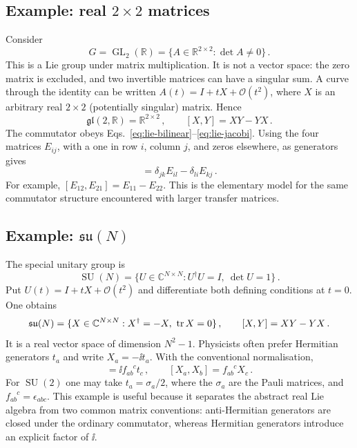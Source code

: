 \subsection{Example: real \texorpdfstring{$2\times2$}{2 x 2} matrices}

Consider
\begin{equation}
    G = \operatorname{GL}_2(\mathbb{R})
      = \{A\in\mathbb{R}^{2\times2}:\det A\ne0\}\,.
\end{equation}
This is a Lie group under matrix multiplication.  It is not a vector space:
the zero matrix is excluded, and two invertible matrices can have a singular
sum.  A curve through the identity can be written
$A(t) = I + tX + \mathcal{O}(t^2)$, where $X$ is an arbitrary real $2\times2$
(potentially singular) matrix.  Hence
\begin{equation}
    \mathfrak{gl}(2,\mathbb{R}) = \mathbb{R}^{2\times2}\,,
    \qquad [X,Y] = XY - YX\,.
\end{equation}
The commutator obeys Eqs.~\eqref{eq:lie-bilinear}--\eqref{eq:lie-jacobi}.
Using the four matrices $E_{ij}$, with a one in row $i$, column $j$, and
zeros elsewhere, as generators gives
\begin{equation}
    [E_{ij},E_{kl}] = \delta_{jk}E_{il}-\delta_{li}E_{kj}\,.
\end{equation}
For example,
$[E_{12},E_{21}] = E_{11}-E_{22}$.  This is the elementary model for the
same commutator structure encountered with larger transfer matrices.


\subsection{Example: \texorpdfstring{$\mathfrak{su}(N)$}{su(N)}}

The special unitary group is
\begin{equation}
    \operatorname{SU}(N) = \{U\in\mathbb{C}^{N\times N}:U^\dagger U
                         = I,\ \det U = 1\}\,.
\end{equation}
Put $U(t) = I + tX + \mathcal{O}(t^2)$ and differentiate both defining
conditions at $t = 0$.  One obtains
\begin{equation}
    \mathfrak{su}(N) = \{X\in\mathbb{C}^{N\times N}:X^\dagger
                     = -X,\ \operatorname{tr} X = 0\}\,,
    \qquad [X,Y] = XY - YX\,.
\end{equation}
It is a real vector space of dimension $N^2-1$.  Physicists often prefer
Hermitian generators $t_a$ and write $X_a = -\ii t_a$.  With the conventional
normalisation,
\begin{equation}
    [t_a,t_b] = \ii f_{ab}^{\phantom{ab}c}t_c\,,
    \qquad
    [X_a,X_b] = f_{ab}^{\phantom{ab}c}X_c\,.
\end{equation}
For $\operatorname{SU}(2)$ one may take $t_a = \sigma_a/2$, where the
$\sigma_a$ are the Pauli matrices, and
$f_{ab}^{\phantom{ab}c} = \epsilon_{abc}$.  This example is useful because it
separates the abstract real Lie algebra from two common matrix conventions:
anti-Hermitian generators are closed under the ordinary commutator, whereas
Hermitian generators introduce an explicit factor of $\ii$.



